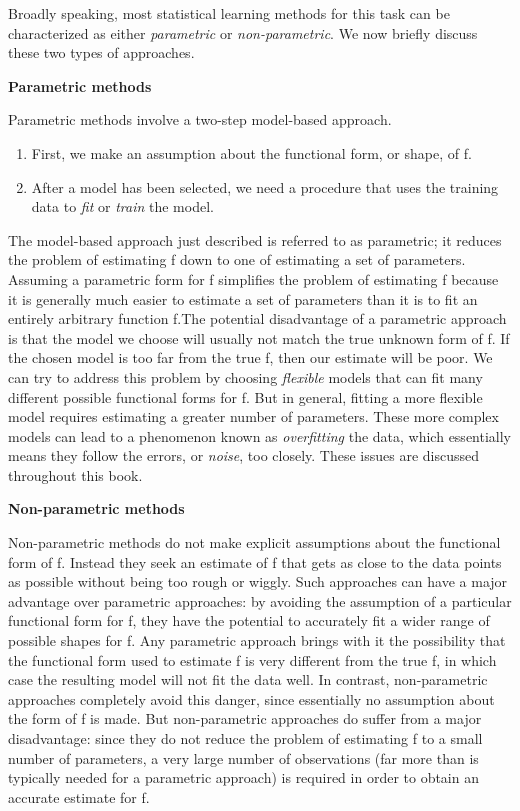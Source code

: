 \documentclass{article}
\theoremstyle{definition}
\theoremstyle{remark}
\begin{document}
Broadly speaking, most statistical learning methods for this task can be characterized as either \textit{parametric} or \textit{non-parametric}. We now briefly discuss these two types of approaches.

\hspace{\fill}

\noindent\textbf{Parametric methods}

Parametric methods involve a two-step model-based approach.
\begin{enumerate}
	\item First, we make an assumption about the functional form, or shape, of f.
	\item After a model has been selected, we need a procedure that uses the training data to \textit{fit} or \textit{train} the model.
\end{enumerate}

The model-based approach just described is referred to as parametric; it reduces the problem of estimating f down to one of estimating a set of parameters. Assuming a parametric form for f simplifies the problem of estimating f because it is generally much easier to estimate a set of parameters than it is to fit an entirely arbitrary function f.The potential disadvantage of a parametric approach is that the model we choose will usually not match the true unknown form of f. If the chosen model is too far from the true f, then our estimate will be poor. We can try to address this problem by choosing \textit{flexible} models that can fit many different possible functional forms for f. But in general, fitting a more flexible model requires estimating a greater number of parameters. These more complex models can lead to a phenomenon known as \textit{overfitting} the data, which essentially means they follow the errors, or \textit{noise}, too closely. These issues are discussed throughout this book.

\hspace{\fill}

\noindent\textbf{Non-parametric methods}

Non-parametric methods do not make explicit assumptions about the functional
form of f. Instead they seek an estimate of f that gets as close to the
data points as possible without being too rough or wiggly. Such approaches
can have a major advantage over parametric approaches: by avoiding the
assumption of a particular functional form for f, they have the potential
to accurately fit a wider range of possible shapes for f. Any parametric
approach brings with it the possibility that the functional form used to
estimate f is very different from the true f, in which case the resulting
model will not fit the data well. In contrast, non-parametric approaches
completely avoid this danger, since essentially no assumption about the
form of f is made. But non-parametric approaches do suffer from a major
disadvantage: since they do not reduce the problem of estimating f to a
small number of parameters, a very large number of observations (far more
than is typically needed for a parametric approach) is required in order to
obtain an accurate estimate for f.
\end{document}
